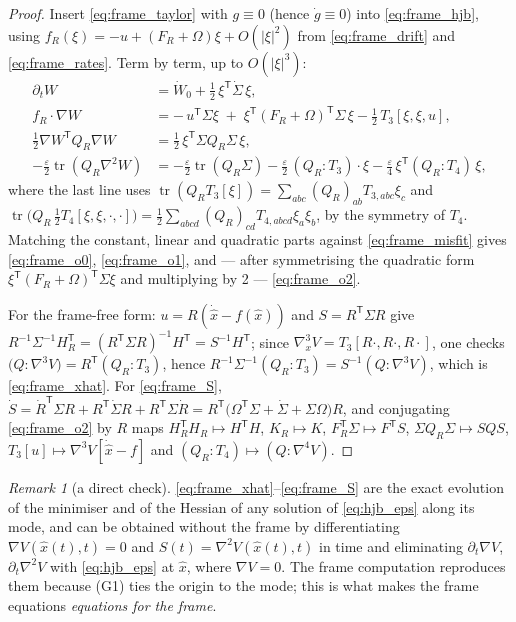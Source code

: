 \documentclass[11pt,a4paper]{article}
\newcommand{\tr}{\operatorname{tr}}
\newcommand{\T}{^{\mathsf T}}
\newcommand{\xh}{\hat{x}}
\newcommand{\eps}{\varepsilon}
\newcommand{\abs}[1]{\left\lvert #1 \right\rvert}
\newcommand{\grad}{\nabla}
\theoremstyle{plain}
\theoremstyle{definition}
\theoremstyle{remark}
\newtheorem{remark}{Remark}
\begin{document}
\begin{proof}
Insert \eqref{eq:frame_taylor} with $g\equiv0$ (hence $\dot g\equiv0$) into \eqref{eq:frame_hjb}, using $f_R(\xi) = -u + (F_R+\Omega)\xi + O(\abs\xi^2)$ from \eqref{eq:frame_drift} and \eqref{eq:frame_rates}. Term by term, up to $O(\abs\xi^3)$:
\begin{align*}
  \partial_tW &= \dot W_0 + \tfrac12\,\xi\T\dot\Sigma\,\xi,\\
  f_R\cdot\grad W &= -\,u\T\Sigma\xi \;+\; \xi\T(F_R+\Omega)\T\Sigma\,\xi - \tfrac12\,T_3[\xi,\xi,u],\\
  \tfrac12\grad W\T Q_R\grad W &= \tfrac12\,\xi\T\Sigma Q_R\Sigma\,\xi,\\
  -\tfrac\eps2\tr(Q_R\grad^2W) &= -\tfrac\eps2\tr(Q_R\Sigma) - \tfrac\eps2\,(Q_R\!:\!T_3)\cdot\xi - \tfrac\eps4\,\xi\T(Q_R\!:\!T_4)\,\xi ,
\end{align*}
where the last line uses $\tr(Q_RT_3[\xi]) = \sum_{abc}(Q_R)_{ab}T_{3,abc}\xi_c$ and $\tr\big(Q_R\,\tfrac12T_4[\xi,\xi,\cdot,\cdot]\big) = \tfrac12\sum_{abcd}(Q_R)_{cd}T_{4,abcd}\xi_a\xi_b$, by the symmetry of $T_4$. Matching the constant, linear and quadratic parts against \eqref{eq:frame_misfit} gives \eqref{eq:frame_o0}, \eqref{eq:frame_o1}, and --- after symmetrising the quadratic form $\xi\T(F_R+\Omega)\T\Sigma\xi$ and multiplying by 2 --- \eqref{eq:frame_o2}.

For the frame-free form: $u = R(\dot{\xh}-f(\xh))$ and $S=R\T\Sigma R$ give $R^{-1}\Sigma^{-1}H_R\T = (R\T\Sigma R)^{-1}H\T = S^{-1}H\T$; since $\grad_x^3V = T_3[R\cdot,R\cdot,R\cdot]$, one checks $\big(Q\!:\!\grad^3V\big) = R\T(Q_R\!:\!T_3)$, hence $R^{-1}\Sigma^{-1}(Q_R\!:\!T_3) = S^{-1}(Q\!:\!\grad^3V)$, which is \eqref{eq:frame_xhat}. For \eqref{eq:frame_S}, $\dot S = \dot R\T\Sigma R + R\T\dot\Sigma R + R\T\Sigma\dot R = R\T\big(\Omega\T\Sigma + \dot\Sigma + \Sigma\Omega\big)R$, and conjugating \eqref{eq:frame_o2} by $R$ maps $H_R\T H_R\mapsto H\T H$, $K_R\mapsto K$, $F_R\T\Sigma\mapsto F\T S$, $\Sigma Q_R\Sigma\mapsto SQS$, $T_3[u]\mapsto\grad^3V[\dot{\xh}-f]$ and $(Q_R\!:\!T_4)\mapsto(Q\!:\!\grad^4V)$.
\end{proof}

\begin{remark}[a direct check]
\eqref{eq:frame_xhat}--\eqref{eq:frame_S} are the exact evolution of the minimiser and of the Hessian of any solution of \eqref{eq:hjb_eps} along its mode, and can be obtained without the frame by differentiating $\grad V(\xh(t),t)=0$ and $S(t)=\grad^2V(\xh(t),t)$ in time and eliminating $\partial_t\grad V$, $\partial_t\grad^2V$ with \eqref{eq:hjb_eps} at $\xh$, where $\grad V=0$. The frame computation reproduces them because (G1) ties the origin to the mode; this is what makes the frame equations \emph{equations for the frame}.
\end{remark}
\end{document}
